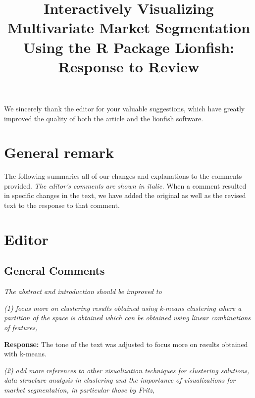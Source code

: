 \documentclass[12pt]{article}
\begin{document}
\title{Interactively Visualizing Multivariate Market Segmentation Using the R Package Lionfish: Response to Review}
\date{}
\maketitle


We sincerely thank the editor for your valuable suggestions, which have greatly improved the quality of both the article and the lionfish software.



\section*{General remark}

The following summaries all of our changes and explanations to the comments provided. %
\textit{The editor's comments are shown in italic.} When a comment resulted in specific changes in the text, we have added the original as well as the revised text to the response to that comment.   

\section*{Editor}

\subsection*{General Comments}

\textit{The abstract and introduction should be improved to}

\textit{(1) focus more on clustering results obtained using k-means clustering
where a partition of the space is obtained which can be obtained using
linear combinations of features,}

    \textbf{Response:} The tone of the text was adjusted to focus more on results obtained with k-means.

\textit{(2) add more references to other visualization techniques for clustering
solutions, data structure analysis in clustering and the importance of
visualizations for market segmentation, in particular those by Fritz,}
\end{document}
